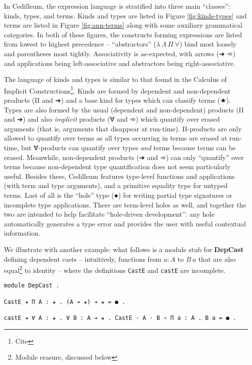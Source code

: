 \documentclass{article}
\begin{document}
In Cedilleum, the expression language is stratified into three main ``classes'':
kinds, types, and terms. Kinds and types are listed in Figure
\ref{fig:kinds-types} and terms are listed in Figure \ref{fig:ann-terms} along
with some auxiliary grammatical categories. In both of these figures, the
constructs forming expressions are listed from lowest to highest precedence --
``abstractors'' ($\lambda\ \Lambda\ \Pi\ \forall$) bind most loosely and
parentheses most tightly. Associativity is as-expected, with arrows (➔ ➾) and
applications being left-associative and abstractors being right-associative.

The language of kinds and types is similar to that found in the Calculus of
Implicit Constructions\footnote{Cite}. Kinds are formed by dependent and
non-dependent products (Π and ➔) and a base kind for types which can classify
terms (★). Types are also formed by the usual (dependent and non-dependent)
products (Π and ➔) and also \textit{implicit} products (∀ and ➾) which quantify
over erased arguments (that is, arguments that disappear at run-time).
Π-products are only allowed to quantify over terms as all types occurring in
terms are erased at run-time, but ∀-products can quantify over types
\textit{and} terms because terms can be erased. Meanwhile, non-dependent
products (➔ and ➾) can only ``quantify'' over terms because non-dependent type
quantification does not seem particularly useful. Besides these, Cedilleum
features type-level functions and applications (with term and type arguments),
and a primitive equality type for untyped terms. Last of all is the ``hole''
type (●) for writing partial type signatures or incomplete type applications.
There are term-level holes as well, and together the two are intended to help
facilitate ``hole-driven development'': any hole automatically generates a type
error and provides the user with useful contextual information.

We illustrate with another example: what follows is a module stub for
\textbf{DepCast} defining dependent casts -- intuitively, functions from $a : A$
to $B\ a$ that are also equal\footnote{Module erasure, discussed below} to
identity -- where the definitions \texttt{CastE} and \texttt{castE} are
incomplete.

\begin{verbatim}
module DepCast .

CastE ◂ Π A : ★ . (A ➔ ★) ➔ ★ = ● .

castE ◂ ∀ A : ★ . ∀ B : A ➔ ★ . CastE · A · B ➾ Π a : A . B a = ● .
\end{verbatim}
\end{document}
